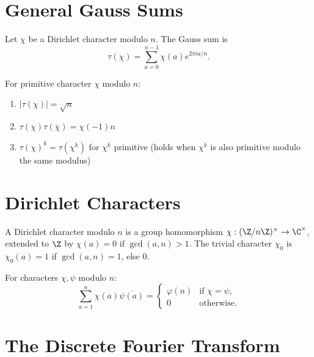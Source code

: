 \section{General Gauss Sums}

\begin{definition}
Let $\chi$ be a Dirichlet character modulo $n$. The Gauss sum is
\[
\tau(\chi) = \sum_{a=0}^{n-1} \chi(a) e^{2\pi i a/n}.
\]
\end{definition}

\begin{theorem}
For primitive character  $\chi$ modulo $n$:
\begin{enumerate}
    \item $|\tau(\chi)| = \sqrt{n}$
    \item $\tau(\chi) \tau(\overline{\chi}) = \chi(-1) n$
    \item $\tau(\chi)^k = \tau(\chi^k)$ for $\chi^k$ primitive (holds when $\chi^k$ is also primitive modulo the same modulus)
\end{enumerate}
\end{theorem}

\section{Dirichlet Characters}

\begin{definition}
A Dirichlet character modulo $n$ is a group homomorphism $\chi: (\Z/n\Z)^\times \to \C^\times$, extended to $\Z$ by $\chi(a) = 0$ if $\gcd(a,n) > 1$. The trivial character $\chi_0$ is $\chi_0(a) = 1$ if $\gcd(a,n)=1$, else $0$.
\end{definition}

\begin{theorem}
For characters $\chi, \psi$ modulo $n$:
\[
\sum_{a=1}^n \chi(a) \overline{\psi(a)} = 
\begin{cases}
\varphi(n) & \text{if } \chi = \psi, \\
0 & \text{otherwise}.
\end{cases}
\]
\end{theorem}

\section{The Discrete Fourier Transform}

